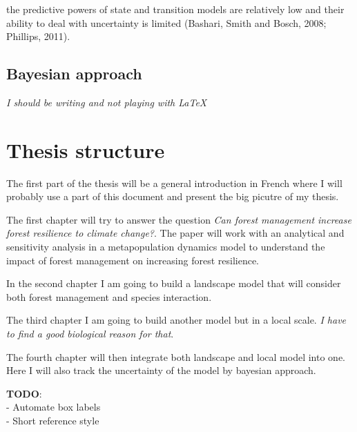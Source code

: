 the predictive powers of state and transition models are relatively low and their ability to deal with uncertainty is limited (Bashari, Smith and Bosch, 2008; Phillips, 2011).

\subsection{Bayesian approach}

\textit{I should be writing and not playing with \LaTeX}

\section{Thesis structure}

The first part of the thesis will be a general introduction in French where  I will probably use a part of this document and present the big picutre of my thesis.

The first chapter will try to answer the question \textit{Can forest management increase forest resilience to climate change?}. The paper will work with an analytical and sensitivity analysis in a metapopulation dynamics model to understand the impact of forest management on increasing forest resilience.

In the second chapter I am going to build a landscape model that will consider both forest management and species interaction.

The third chapter I am going to build another model but in a local scale. \textit{I have to find a good biological reason for that}.

The fourth chapter will then integrate both landscape and local model into one. Here I will also track the uncertainty of the model by bayesian approach.

\textbf{TODO}: \\
- Automate box labels \\
- Short reference style \\

\clearpage



